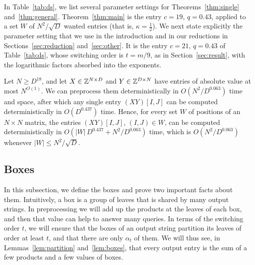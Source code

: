 In Table~\ref{tab:ds}, we list several parameter settings for Theorems~\ref{thm:single} and~\ref{thm:general}. Theorem~\ref{thm:main} is the entry $c=19$, $q=0.43$, applied to a set $W$ of $N^2/\sqrt D$ wanted entries (that is, $\kappa=\frac12$). 
We next state explicitly the parameter setting that we use in the introduction and in our reductions in Sections~\ref{sec:reduction} and~\ref{sec:other}. It is the entry $c=21$, $q=0.43$ of Table~\ref{tab:ds}, whose switching order is $t=m/9$, as in Section~\ref{sec:result}, with the logarithmic factors absorbed into the exponents. 

\begin{corollary}\label{cor:zt}
Let $N\ge D^{18}$, and let $X\in\mathbb{Z}^{N\times D}$ and $Y\in\mathbb{Z}^{D\times N}$ have entries of absolute value at most $N^{O(1)}$. We can preprocess them deterministically in $O(N^2/D^{0.063})$ time and space, after which any single entry $(XY)[I,J]$ can be computed deterministically in $O(D^{0.437})$ time. Hence, for every set $W$ of positions of an $N\times N$ matrix, the entries $(XY)[I,J]$, $(I,J)\in W$, can be computed deterministically in $O(|W|\,D^{0.437}+N^2/D^{0.063})$ time, which is $O(N^2/D^{0.063})$ whenever $|W|\le N^2/\sqrt D$.
\end{corollary}


\subsection{Boxes}\label{sec:boxes}

In this subsection, we define the boxes and prove  two important facts about them. Intuitively, a box is a group of leaves that is shared by many output strings. In preprocessing we will add up the products at the leaves of each box, and then that value can help to answer many queries. In terms of the switching order $t$, we will ensure that the boxes of an output string partition its leaves of order at least $t$, and that there are only $\alpha_t$ of them. We will thus see, in Lemmas~\ref{lem:partition} and~\ref{lem:boxes}, that every output entry is the sum of a few products and a few values of boxes.


